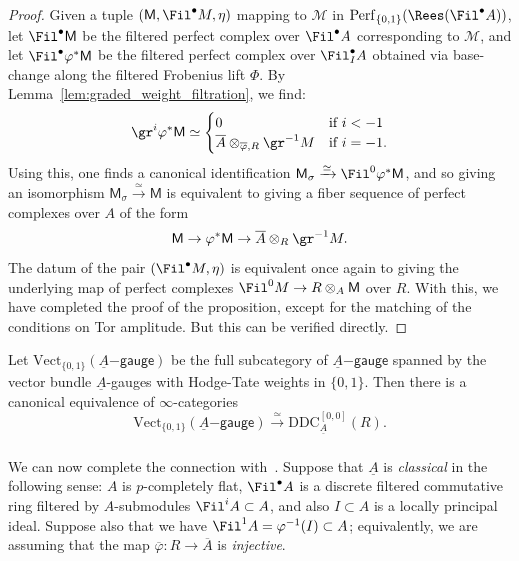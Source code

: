 \documentclass[10pt]{amsart}
\begin{document}
\begin{proof}
Given a tuple $(\mathsf{M},\Fil^\bullet M,\eta)$ mapping to $\mathcal{M}$ in $\mathrm{Perf}_{\{0,1\}}(\Rees(\Fil^\bullet A))$, let $\Fil^\bullet \mathsf{M}$ be the filtered perfect complex over $\Fil^\bullet A$ corresponding to $\mathcal{M}$, and let $\Fil^\bullet\varphi^*\mathsf{M}$ be the filtered perfect complex over $\Fil^\bullet_IA$ obtained via base-change along the filtered Frobenius lift $\Phi$. By Lemma~\ref{lem:graded_weight_filtration}, we find:
\[
\gr^i\varphi^*\mathsf{M} \simeq \begin{cases}
0&\text{if $i<-1$}\\
\overline{A}\otimes_{\overline\varphi,R}\gr^{-1}M&\text{if $i=-1$}.
\end{cases}
\]
Using this, one finds a canonical identification $\mathsf{M}_\sigma\xrightarrow{\simeq}\Fil^0\varphi^*\mathsf{M}$, and so giving an isomorphism $\mathsf{M}_\sigma\xrightarrow{\simeq}\mathsf{M}$ is equivalent to giving a fiber sequence of perfect complexes over $A$ of the form
\[
\mathsf{M}\to \varphi^*\mathsf{M}\to \overline{A}\otimes_R\gr^{-1}M.
\]
The datum of the pair $(\Fil^\bullet M,\eta)$ is equivalent once again to giving the underlying map of perfect complexes $\Fil^0M \to R\otimes_A\mathsf{M}$ over $R$. With this, we have completed the proof of the proposition, except for the matching of the conditions on Tor amplitude. But this can be verified directly.
\end{proof}



\begin{corollary}
\label{cor:adm_dieudonne_vect}
Let $\mathrm{Vect}_{\{0,1\}}(\underline{A}\mathsf{-gauge})$ be the full subcategory of $\underline{A}\mathsf{-gauge}$ spanned by the vector bundle $\underline{A}$-gauges with Hodge-Tate weights in $\{0,1\}$. Then there is a canonical equivalence of $\infty$-categories
\[
\mathrm{Vect}_{\{0,1\}}(\underline{A}\mathsf{-gauge})\xrightarrow{\simeq}\mathrm{DDC}^{[0,0]}_{\underline{A}}(R).
\]
\end{corollary}


\subsubsection{}\label{subsubsec:vect_bundles_alb}
We can now complete the connection with~\cite{MR4530092}. Suppose that $\underline{A}$ is \emph{classical} in the following sense: $A$ is $p$-completely flat, $\Fil^\bullet A$ is a discrete filtered commutative ring filtered by $A$-submodules $\Fil^iA\subset A$, and also $I\subset A$ is a locally principal ideal. Suppose also that we have $\Fil^1A = \varphi^{-1}(I)\subset A$; equivalently, we are assuming that the map $\overline\varphi:R\to \overline{A}$ is \emph{injective}.
\end{document}
